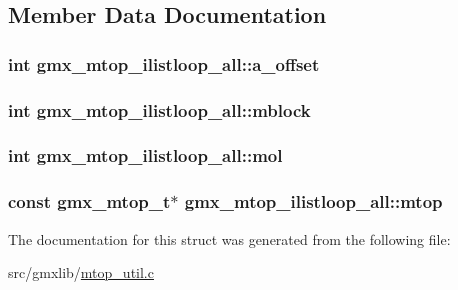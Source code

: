 \subsection{\-Member \-Data \-Documentation}
\hypertarget{structgmx__mtop__ilistloop__all_ac8f5d9ba5dfb95706687377ec575823c}{
\subsubsection[{a\-\_\-offset}]{\setlength{\rightskip}{0pt plus 5cm}int {\bf gmx\-\_\-mtop\-\_\-ilistloop\-\_\-all\-::a\-\_\-offset}}}\label{structgmx__mtop__ilistloop__all_ac8f5d9ba5dfb95706687377ec575823c}
\hypertarget{structgmx__mtop__ilistloop__all_a1305e9a3f945ccce494ea1f67c02dce1}{
\subsubsection[{mblock}]{\setlength{\rightskip}{0pt plus 5cm}int {\bf gmx\-\_\-mtop\-\_\-ilistloop\-\_\-all\-::mblock}}}\label{structgmx__mtop__ilistloop__all_a1305e9a3f945ccce494ea1f67c02dce1}
\hypertarget{structgmx__mtop__ilistloop__all_a93e0b9c52204b5751e9e675c573ddb45}{
\subsubsection[{mol}]{\setlength{\rightskip}{0pt plus 5cm}int {\bf gmx\-\_\-mtop\-\_\-ilistloop\-\_\-all\-::mol}}}\label{structgmx__mtop__ilistloop__all_a93e0b9c52204b5751e9e675c573ddb45}
\hypertarget{structgmx__mtop__ilistloop__all_a0a67ca5f891df6d6793ce677ecfd9fb0}{
\subsubsection[{mtop}]{\setlength{\rightskip}{0pt plus 5cm}const {\bf gmx\-\_\-mtop\-\_\-t}$\ast$ {\bf gmx\-\_\-mtop\-\_\-ilistloop\-\_\-all\-::mtop}}}\label{structgmx__mtop__ilistloop__all_a0a67ca5f891df6d6793ce677ecfd9fb0}


\-The documentation for this struct was generated from the following file\-:\begin{DoxyCompactItemize}
\item 
src/gmxlib/\hyperlink{mtop__util_8c}{mtop\-\_\-util.\-c}\end{DoxyCompactItemize}
